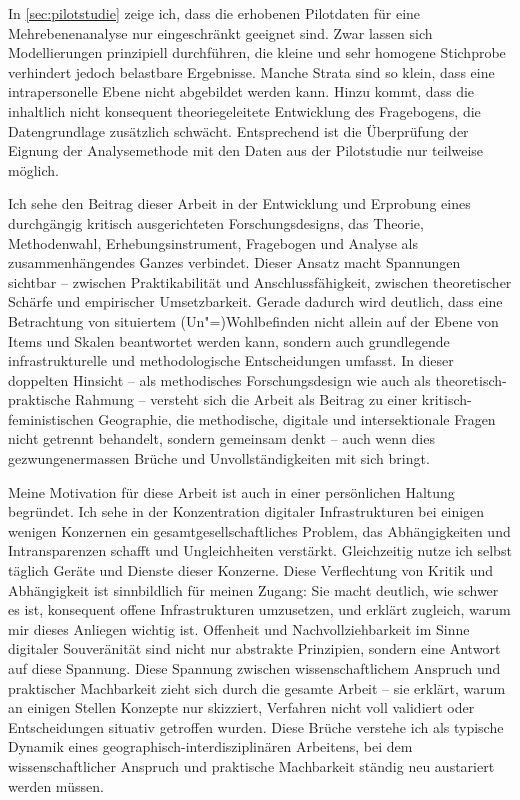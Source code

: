 In \cref{sec:pilotstudie} zeige ich, dass die erhobenen Pilotdaten für eine  Mehrebenenanalyse nur eingeschränkt geeignet sind. Zwar lassen sich Modellierungen prinzipiell durchführen, die kleine und sehr homogene Stichprobe verhindert jedoch belastbare Ergebnisse. Manche Strata sind so klein, dass eine intrapersonelle Ebene nicht abgebildet werden kann. Hinzu kommt, dass die inhaltlich nicht konsequent theoriegeleitete Entwicklung des Fragebogens, die Datengrundlage zusätzlich schwächt. Entsprechend ist die Überprüfung der Eignung der Analysemethode mit den Daten aus der Pilotstudie nur teilweise möglich.

Ich sehe den Beitrag dieser Arbeit in der Entwicklung und Erprobung eines durchgängig kritisch ausgerichteten Forschungsdesigns, das Theorie, Methodenwahl, Erhebungsinstrument, Fragebogen und Analyse als zusammenhängendes Ganzes verbindet. Dieser Ansatz macht Spannungen sichtbar -- zwischen Praktikabilität und Anschlussfähigkeit, zwischen theoretischer Schärfe und empirischer Umsetzbarkeit. Gerade dadurch wird deutlich, dass eine  Betrachtung von situiertem (Un\nobreakdash"=)Wohlbefinden nicht allein auf der Ebene von Items und Skalen beantwortet werden kann, sondern auch grundlegende infrastrukturelle und methodologische Entscheidungen umfasst. In dieser doppelten Hinsicht -- als methodisches Forschungsdesign wie auch als theoretisch-praktische Rahmung -- versteht sich die Arbeit als Beitrag zu einer kritisch-feministischen Geographie, die methodische, digitale und intersektionale Fragen nicht getrennt behandelt, sondern gemeinsam denkt -- auch wenn dies gezwungenermassen Brüche und Unvollständigkeiten mit sich bringt.

Meine Motivation für diese Arbeit ist auch in einer persönlichen Haltung begründet. Ich sehe in der Konzentration digitaler Infrastrukturen bei einigen wenigen Konzernen ein gesamtgesellschaftliches Problem, das Abhängigkeiten und Intransparenzen schafft und Ungleichheiten verstärkt. Gleichzeitig nutze ich selbst täglich Geräte und Dienste dieser Konzerne. Diese Verflechtung von Kritik und Abhängigkeit ist sinnbildlich für meinen Zugang: Sie macht deutlich, wie schwer es ist, konsequent offene Infrastrukturen umzusetzen, und erklärt zugleich, warum mir dieses Anliegen wichtig ist. Offenheit und Nachvollziehbarkeit im Sinne digitaler Souveränität sind nicht nur abstrakte Prinzipien, sondern eine Antwort auf diese Spannung. Diese Spannung zwischen wissenschaftlichem Anspruch und praktischer Machbarkeit zieht sich durch die gesamte Arbeit -- sie erklärt, warum an einigen Stellen Konzepte nur skizziert, Verfahren nicht voll validiert oder Entscheidungen situativ getroffen wurden. Diese Brüche verstehe ich als typische Dynamik eines geographisch-interdisziplinären Arbeitens, bei dem wissenschaftlicher Anspruch und praktische Machbarkeit ständig neu austariert werden müssen.

